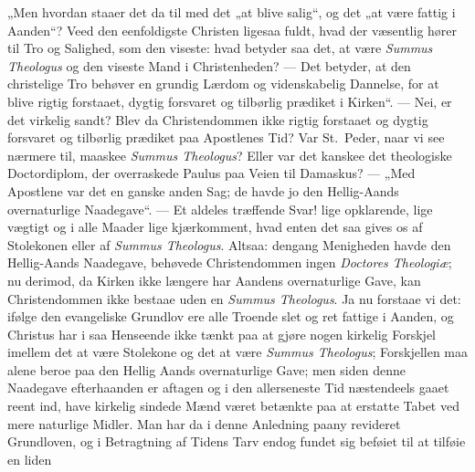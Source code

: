 \documentclass[12pt,a4paper]{book}
\begin{document}
„Men hvordan staaer det da til med det „at blive salig“, og det „at være fattig i
Aanden“? Veed den eenfoldigste Christen ligesaa fuldt, hvad der væsentlig hører til Tro
og Salighed, som den viseste: hvad betyder saa det, at være \textit{Summus Theologus}
og den viseste Mand i Christenheden? --- Det betyder, at den christelige Tro behøver en
grundig Lærdom og videnskabelig
Dannelse, for at blive rigtig forstaaet, dygtig forsvaret og tilbørlig prædiket i
Kirken“. --- Nei, er det virkelig sandt? Blev da Christendommen ikke rigtig forstaaet og
dygtig forsvaret og tilbørlig prædiket paa Apostlenes Tid? Var St.\ Peder, naar vi see
nærmere til, maaskee \textit{Summus Theologus}? Eller var det kanskee det theologiske
Doctordiplom, der overraskede Paulus paa Veien til Damaskus? --- „Med Apostlene var det
en ganske anden Sag; de havde jo den Hellig-Aands overnaturlige Naadegave“. --- Et
aldeles træffende Svar! lige opklarende, lige vægtigt og i alle Maader lige
kjærkomment, hvad enten det saa gives os af Stolekonen eller af \textit{Summus
Theologus}. Altsaa: dengang Menigheden havde den Hellig-Aands Naadegave, behøvede
Christendommen ingen \textit{Doctores Theologiæ}; nu derimod, da Kirken ikke længere
har Aandens overnaturlige Gave, kan Christendommen ikke bestaae uden en \textit{Summus
Theologus}. Ja nu forstaae vi det: ifølge den evangeliske Grundlov ere alle Troende
slet og ret fattige i Aanden, og Christus har i saa Henseende ikke tænkt paa at gjøre
nogen kirkelig Forskjel imellem det at være Stolekone og det at være \textit{Summus
Theologus}; Forskjellen maa alene beroe paa den Hellig Aands overnaturlige Gave; men
siden denne Naadegave efterhaanden er aftagen og i den allerseneste Tid næstendeels
gaaet reent ind, have kirkelig sindede Mænd været betænkte paa at erstatte Tabet ved
mere naturlige Midler. Man har da i denne Anledning paany revideret Grundloven, og i
Betragtning af Tidens Tarv endog fundet sig beføiet til at tilføie en liden
\end{document}
